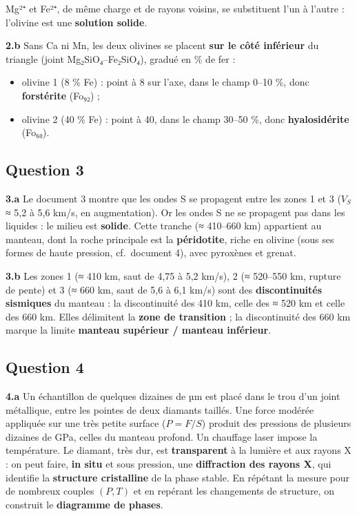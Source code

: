 \documentclass[11pt,a4paper]{article}
\providecommand{\tightlist}{\setlength{\itemsep}{0pt}\setlength{\parskip}{0pt}}
\begin{document}
Mg²⁺ et Fe²⁺, de même charge et de rayons voisins, se substituent l'un à l'autre : l'olivine est une \textbf{solution solide}.

\textbf{2.b} Sans Ca ni Mn, les deux olivines se placent \textbf{sur le côté inférieur} du triangle (joint Mg₂SiO₄--Fe₂SiO₄), gradué en \% de fer :

\begin{itemize}
\tightlist
\item
  olivine 1 (8 \% Fe) : point à 8 sur l'axe, dans le champ 0--10 \%, donc \textbf{forstérite} (Fo₉₂) ;
\item
  olivine 2 (40 \% Fe) : point à 40, dans le champ 30--50 \%, donc \textbf{hyalosidérite} (Fo₆₀).
\end{itemize}

\hypertarget{question-3}{%
\subsection{Question 3}\label{question-3}}

\textbf{3.a} Le document 3 montre que les ondes S se propagent entre les zones 1 et 3 (\(V_S\) ≈ 5,2 à 5,6 km/s, en augmentation). Or les ondes S ne se propagent pas dans les liquides : le milieu est \textbf{solide}. Cette tranche (≈ 410--660 km) appartient au manteau, dont la roche principale est la \textbf{péridotite}, riche en olivine (sous ses formes de haute pression, cf.~document 4), avec pyroxènes et grenat.

\textbf{3.b} Les zones 1 (≈ 410 km, saut de 4,75 à 5,2 km/s), 2 (≈ 520--550 km, rupture de pente) et 3 (≈ 660 km, saut de 5,6 à 6,1 km/s) sont des \textbf{discontinuités sismiques} du manteau : la discontinuité des 410 km, celle des ≈ 520 km et celle des 660 km. Elles délimitent la \textbf{zone de transition} ; la discontinuité des 660 km marque la limite \textbf{manteau supérieur / manteau inférieur}.

\hypertarget{question-4}{%
\subsection{Question 4}\label{question-4}}

\textbf{4.a} Un échantillon de quelques dizaines de µm est placé dans le trou d'un joint métallique, entre les pointes de deux diamants taillés. Une force modérée appliquée sur une très petite surface (\(P = F/S\)) produit des pressions de plusieurs dizaines de GPa, celles du manteau profond. Un chauffage laser impose la température. Le diamant, très dur, est \textbf{transparent} à la lumière et aux rayons X : on peut faire, \textbf{in situ} et sous pression, une \textbf{diffraction des rayons X}, qui identifie la \textbf{structure cristalline} de la phase stable. En répétant la mesure pour de nombreux couples \((P, T)\) et en repérant les changements de structure, on construit le \textbf{diagramme de phases}.
\end{document}
